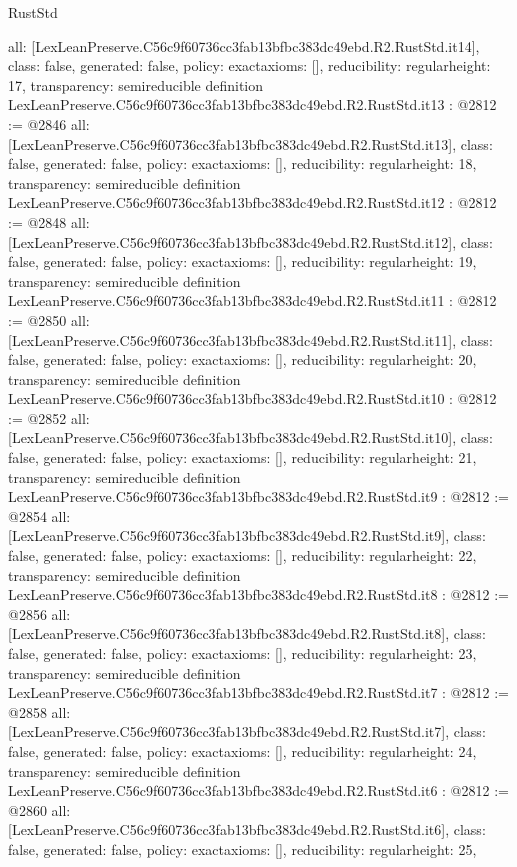\begin{lexlean}{RustStd}
\begin{coremodule}
{  all: [LexLeanPreserve.C56c9f60736cc3fab13bfbc383dc49ebd.R2.RustStd.it14],
  class: false,
  generated: false,
  policy: exact{axioms: []},
  reducibility: regular{height: 17},
  transparency: semireducible
}
definition LexLeanPreserve.C56c9f60736cc3fab13bfbc383dc49ebd.R2.RustStd.it13 : @2812 := @2846 {
  all: [LexLeanPreserve.C56c9f60736cc3fab13bfbc383dc49ebd.R2.RustStd.it13],
  class: false,
  generated: false,
  policy: exact{axioms: []},
  reducibility: regular{height: 18},
  transparency: semireducible
}
definition LexLeanPreserve.C56c9f60736cc3fab13bfbc383dc49ebd.R2.RustStd.it12 : @2812 := @2848 {
  all: [LexLeanPreserve.C56c9f60736cc3fab13bfbc383dc49ebd.R2.RustStd.it12],
  class: false,
  generated: false,
  policy: exact{axioms: []},
  reducibility: regular{height: 19},
  transparency: semireducible
}
definition LexLeanPreserve.C56c9f60736cc3fab13bfbc383dc49ebd.R2.RustStd.it11 : @2812 := @2850 {
  all: [LexLeanPreserve.C56c9f60736cc3fab13bfbc383dc49ebd.R2.RustStd.it11],
  class: false,
  generated: false,
  policy: exact{axioms: []},
  reducibility: regular{height: 20},
  transparency: semireducible
}
definition LexLeanPreserve.C56c9f60736cc3fab13bfbc383dc49ebd.R2.RustStd.it10 : @2812 := @2852 {
  all: [LexLeanPreserve.C56c9f60736cc3fab13bfbc383dc49ebd.R2.RustStd.it10],
  class: false,
  generated: false,
  policy: exact{axioms: []},
  reducibility: regular{height: 21},
  transparency: semireducible
}
definition LexLeanPreserve.C56c9f60736cc3fab13bfbc383dc49ebd.R2.RustStd.it9 : @2812 := @2854 {
  all: [LexLeanPreserve.C56c9f60736cc3fab13bfbc383dc49ebd.R2.RustStd.it9],
  class: false,
  generated: false,
  policy: exact{axioms: []},
  reducibility: regular{height: 22},
  transparency: semireducible
}
definition LexLeanPreserve.C56c9f60736cc3fab13bfbc383dc49ebd.R2.RustStd.it8 : @2812 := @2856 {
  all: [LexLeanPreserve.C56c9f60736cc3fab13bfbc383dc49ebd.R2.RustStd.it8],
  class: false,
  generated: false,
  policy: exact{axioms: []},
  reducibility: regular{height: 23},
  transparency: semireducible
}
definition LexLeanPreserve.C56c9f60736cc3fab13bfbc383dc49ebd.R2.RustStd.it7 : @2812 := @2858 {
  all: [LexLeanPreserve.C56c9f60736cc3fab13bfbc383dc49ebd.R2.RustStd.it7],
  class: false,
  generated: false,
  policy: exact{axioms: []},
  reducibility: regular{height: 24},
  transparency: semireducible
}
definition LexLeanPreserve.C56c9f60736cc3fab13bfbc383dc49ebd.R2.RustStd.it6 : @2812 := @2860 {
  all: [LexLeanPreserve.C56c9f60736cc3fab13bfbc383dc49ebd.R2.RustStd.it6],
  class: false,
  generated: false,
  policy: exact{axioms: []},
  reducibility: regular{height: 25},
}
\end{coremodule}
\end{lexlean}
